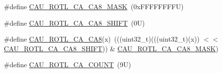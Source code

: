 \begin{DoxyCompactItemize}
\item 
\#define \mbox{\hyperlink{group___c_a_u___register___masks_ga4453f2b5a0d2dd265cf121960804c8a7}{C\+A\+U\+\_\+\+R\+O\+T\+L\+\_\+\+C\+A\+\_\+\+C\+A8\+\_\+\+M\+A\+SK}}~(0x\+F\+F\+F\+F\+F\+F\+F\+F\+U)
\item 
\#define \mbox{\hyperlink{group___c_a_u___register___masks_ga36c108071b9cf5eef7d56d3b6c5bfbf8}{C\+A\+U\+\_\+\+R\+O\+T\+L\+\_\+\+C\+A\+\_\+\+C\+A8\+\_\+\+S\+H\+I\+FT}}~(0\+U)
\item 
\#define \mbox{\hyperlink{group___c_a_u___register___masks_gac4d27277c32faec31fb884c090e0766a}{C\+A\+U\+\_\+\+R\+O\+T\+L\+\_\+\+C\+A\+\_\+\+C\+A8}}(x)~(((uint32\+\_\+t)(((uint32\+\_\+t)(x)) $<$$<$ \mbox{\hyperlink{group___c_a_u___register___masks_ga36c108071b9cf5eef7d56d3b6c5bfbf8}{C\+A\+U\+\_\+\+R\+O\+T\+L\+\_\+\+C\+A\+\_\+\+C\+A8\+\_\+\+S\+H\+I\+FT}})) \& \mbox{\hyperlink{group___c_a_u___register___masks_ga4453f2b5a0d2dd265cf121960804c8a7}{C\+A\+U\+\_\+\+R\+O\+T\+L\+\_\+\+C\+A\+\_\+\+C\+A8\+\_\+\+M\+A\+SK}})
\item 
\#define \mbox{\hyperlink{group___c_a_u___register___masks_gaa831320df96c715145c93f8eb2c05f56}{C\+A\+U\+\_\+\+R\+O\+T\+L\+\_\+\+C\+A\+\_\+\+C\+O\+U\+NT}}~(9\+U)
\end{DoxyCompactItemize}
